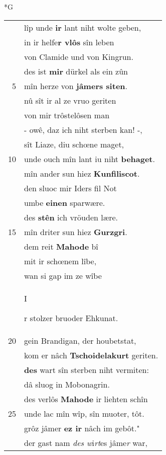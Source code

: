 \documentclass[8pt,a4paper,notitlepage]{article}
\begin{document}
\newpage
\begin{table}[ht]
\begin{minipage}[t]{0.5\linewidth}
\small
\begin{center}*G
\end{center}
\begin{tabular}{rl}
 & lîp unde \textbf{ir} lant niht wolte geben,\\ 
 & in ir helfe\textbf{r vlôs} sîn leben\\ 
 & von Clamide und von Kingrun.\\ 
 & des ist \textbf{mir} dürkel als ein zûn\\ 
5 & mîn herze von \textbf{jâmers siten}.\\ 
 & nû sît ir al ze vruo geriten\\ 
 & von mir trôstelôsen man\\ 
 & - owê, daz ich niht sterben kan! -,\\ 
 & sît Liaze, diu schœne maget,\\ 
10 & unde ouch mîn lant iu niht \textbf{behaget}.\\ 
 & mîn ander sun hiez \textbf{Kunfiliscot}.\\ 
 & den sluoc mir Iders fil Not\\ 
 & umbe \textbf{einen} sparwære.\\ 
 & des \textbf{stên} ich vröuden lære.\\ 
15 & mîn driter sun hiez \textbf{Gurzgri}.\\ 
 & dem reit \textbf{Mahode} bî\\ 
 & mit ir schœnem lîbe,\\ 
 & wan si gap im ze wîbe\\ 
 & \begin{large}I\end{large}r stolzer bruoder Ehkunat.\\ 
20 & gein Brandigan, der houbetstat,\\ 
 & kom er nâch \textbf{Tschoidelakurt} geriten.\\ 
 & \textbf{des} wart sîn sterben niht vermiten:\\ 
 & dâ sluog in Mobonagrin.\\ 
 & des verlôs \textbf{Mahode} ir liehten schîn\\ 
25 & unde lac mîn wîp, sîn muoter, tôt.\\ 
 & grôz jâmer \textbf{ez ir} nâch im gebôt."\\ 
 & der gast nam \textit{des w}i\textit{rt}es jâme\textit{r} war,\\ 

\end{tabular}
\end{minipage}
\end{table}
\end{document}
